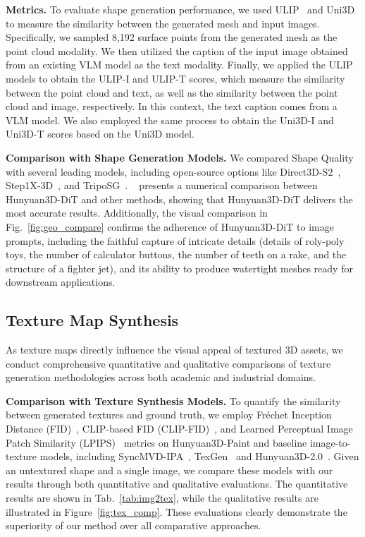 \textbf{Metrics.} To evaluate shape generation performance, we used ULIP~\cite{xue2023ulip} and Uni3D~\cite{zhouuni3d} to measure the similarity between the generated mesh and input images. Specifically, we sampled 8,192 surface points from the generated mesh as the point cloud modality. We then utilized the caption of the input image obtained from an existing VLM model as the text modality. Finally, we applied the ULIP models to obtain the ULIP-I and ULIP-T scores, which measure the similarity between the point cloud and text, as well as the similarity between the point cloud and image, respectively. In this context, the text caption comes from a VLM model. We also employed the same process to obtain the Uni3D-I and Uni3D-T scores based on the Uni3D model.

\textbf{Comparison with Shape Generation Models.} We compared Shape Quality with several leading models, including open-source options like Direct3D-S2~\cite{wu2025direct3ds2gigascale3dgeneration}, Step1X-3D~\cite{li2025step1x}, and TripoSG~\cite{li2025triposg}. ~ presents a numerical comparison between Hunyuan3D-DiT and other methods, showing that Hunyuan3D-DiT delivers the most accurate results. Additionally, the visual comparison in Fig.~\ref{fig:geo_compare} confirms the adherence of Hunyuan3D-DiT to image prompts, including the faithful capture of intricate details (details of roly-poly toys, the number of calculator buttons, the number of teeth on a rake, and the structure of a fighter jet), and its ability to produce watertight meshes ready for downstream applications.

\subsection{Texture Map Synthesis}
\label{sec:texture_sythesis}

As texture maps directly influence the visual appeal of textured 3D assets, we conduct comprehensive quantitative and qualitative comparisons of texture generation methodologies across both academic and industrial domains.

\textbf{Comparison with Texture Synthesis Models.} To quantify the similarity between generated textures and ground truth, we employ Fréchet Inception Distance (FID)~\cite{heusel2017gans}, CLIP-based FID (CLIP-FID)~\cite{radford2021learning}, and Learned Perceptual Image Patch Similarity (LPIPS)~\cite{zhang2018unreasonable} metrics on Hunyuan3D-Paint and baseline image-to-texture models, including SyncMVD-IPA~\cite{liu2024text}, TexGen~\cite{yu2024texgen} and Hunyuan3D-2.0~\cite{zhao2025hunyuan3d}. Given an untextured shape and a single image, we compare these models with our results through both quantitative and qualitative evaluations. The quantitative results are shown in Tab.~\ref{tab:img2tex}, while the qualitative results are illustrated in Figure~\ref{fig:tex_comp}. These evaluations clearly demonstrate the superiority of our method over all comparative approaches.

